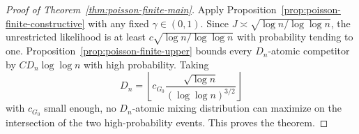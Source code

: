 \documentclass[11pt]{article}
\theoremstyle{definition}
\numberwithin{equation}{section}
\begin{document}
\begin{proof}[Proof of Theorem~\ref{thm:poisson-finite-main}]
Apply Proposition~\ref{prop:poisson-finite-constructive} with any fixed \(\gamma\in(0,1)\). Since \(J\asymp\sqrt{\log n/\log\log n}\), the unrestricted likelihood is at least \(c\sqrt{\log n/\log\log n}\) with probability tending to one. Proposition~\ref{prop:poisson-finite-upper} bounds every \(D_n\)-atomic competitor by \(C D_n\log\log n\) with high probability. Taking
\[
    D_n=
    \left\lfloor
        c_{G_0}\frac{\sqrt{\log n}}{(\log\log n)^{3/2}}
    \right\rfloor
\]
with \(c_{G_0}\) small enough, no \(D_n\)-atomic mixing distribution can maximize on the intersection of the two high-probability events. This proves the theorem.
\end{proof}

\small


\end{document}

